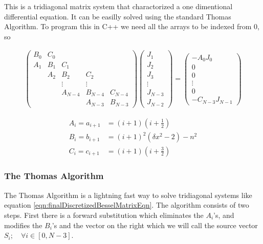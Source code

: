 \documentclass[onecolumn, groupedaddress, 10pt]{revtex4-1}
\begin{document}
This is a tridiagonal matrix system that charactorized a one dimentional differential equation.  It can be easilly solved using the standard Thomas Algorithm.  To program this in C++ we need all the arrays to be indexed from 0, so 

\begin{align}
\label{eqn:finalDiscretizedBesselMatrixEqn}
\left( \begin{array}{ccccc}
	B_0 & C_0 &         &         &         \\
	A_1 & B_1 &   C_1   &         &         \\
	    & A_2 &   B_2   &   C_2   &         \\
	    &     & \vdots  & \vdots  &         \\
	    &     & A_{N-4} & B_{N-4} & C_{N-4} \\
	    &     &         & A_{N-3} & B_{N-3}
\end{array} \right)
\left( \begin{array}{c}
	  J_1   \\
	  J_2   \\
	  J_3   \\
	\vdots  \\
	J_{N-3} \\
	J_{N-2}
\end{array} \right)
=
\left( \begin{array}{c}
	    - A_0 J_0     \\
	        0         \\
	        0         \\
	     \vdots       \\
	        0         \\
	- C_{N-3} J_{N-1}
\end{array} \right)
\end{align}

\begin{align}
A_i = a_{i+1} &= (i+1)   \left( i + \frac{1}{2} \right)				\\
B_i = b_{i+1} &= (i+1)^2 \left( \delta x^2 - 2  \right) - n^2			\\
C_i = c_{i+1} &= (i+1)   \left( i + \frac{3}{2} \right)
\end{align}

\subsubsection{The Thomas Algorithm}
The Thomas Algorithm is a lightning fast way to solve tridiagonal systems like equation \ref{eqn:finalDiscretizedBesselMatrixEqn}.  The algorithm consists of two steps.  First there is a forward substitution which eliminates the $A_i$'s, and modifies the $B_i$'s and the vector on the right which we will call the source vector $S_i; \quad \forall i \in [0, N-3]$.
\end{document}
